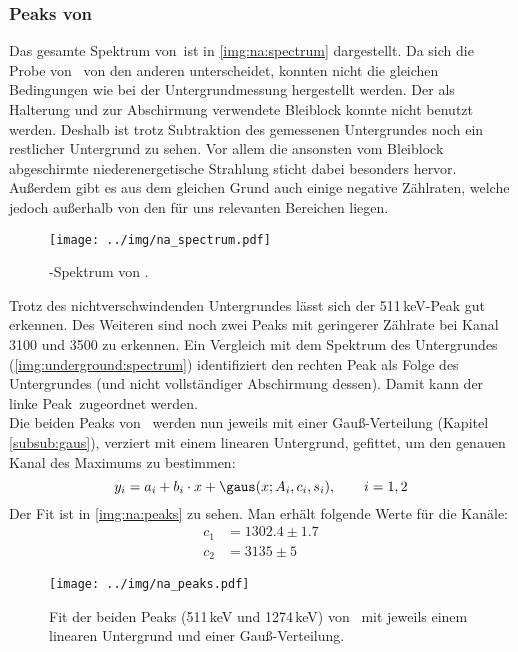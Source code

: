 \subsubsection{Peaks von \na}
\label{subsub:eval:na}
Das gesamte Spektrum von \na\,ist in \autoref{img:na:spectrum} dargestellt. Da sich die Probe von \na\, von den anderen unterscheidet, konnten nicht die 
gleichen Bedingungen wie bei der Untergrundmessung hergestellt werden. Der als Halterung und zur Abschirmung verwendete Bleiblock konnte nicht 
benutzt werden. Deshalb ist trotz Subtraktion des gemessenen Untergrundes noch ein restlicher Untergrund zu sehen. Vor allem die ansonsten vom Bleiblock abgeschirmte 
niederenergetische Strahlung sticht dabei besonders hervor. Außerdem gibt es aus dem gleichen Grund auch einige negative Zählraten, welche jedoch 
außerhalb von den für uns relevanten Bereichen liegen.
\begin{figure}[H]
\begin{center}
  \texttt{[image: ../img/na\_spectrum.pdf]}
  \caption{\textgamma-Spektrum von .}
  \label{img:na:spectrum}
\end{center}
\end{figure}
Trotz des nichtverschwindenden Untergrundes lässt sich der 511\,keV-Peak gut erkennen. Des Weiteren sind noch zwei Peaks mit geringerer 
Zählrate bei Kanal 3100 und 3500 zu erkennen. Ein Vergleich mit dem Spektrum des Untergrundes (\autoref{img:underground:spectrum}) identifiziert 
den rechten Peak als Folge des Untergrundes (und nicht vollständiger Abschirmung dessen). Damit kann der linke Peak \na\,zugeordnet werden.\\[\baselineskip]
Die beiden Peaks von \na\, werden nun jeweils mit einer Gauß-Verteilung (Kapitel \ref{subsub:gaus}), verziert mit einem linearen Untergrund, 
gefittet, um den genauen Kanal des Maximums zu bestimmen:
\begin{equation}
  y_i = a_i + b_i \cdot x + \gaus(x; A_i, c_i, s_i), \qquad i = 1, 2
\end{equation}
Der Fit ist in \autoref{img:na:peaks} zu sehen. Man erhält folgende Werte für die Kanäle:
\begin{equation}
\begin{split}
  \label{eq:na:channels}
  c_1 &= 1302.4  \pm 1.7 \\
  c_2 &= 3135  \pm 5 
\end{split}
\end{equation}
\begin{figure}[H]
\begin{center}
  \texttt{[image: ../img/na\_peaks.pdf]}
  \caption{Fit der beiden Peaks (511\,keV und 1274\,keV) von \na\, mit jeweils einem linearen Untergrund und einer Gauß-Verteilung.}
  \label{img:na:peaks}
\end{center}
\end{figure}

